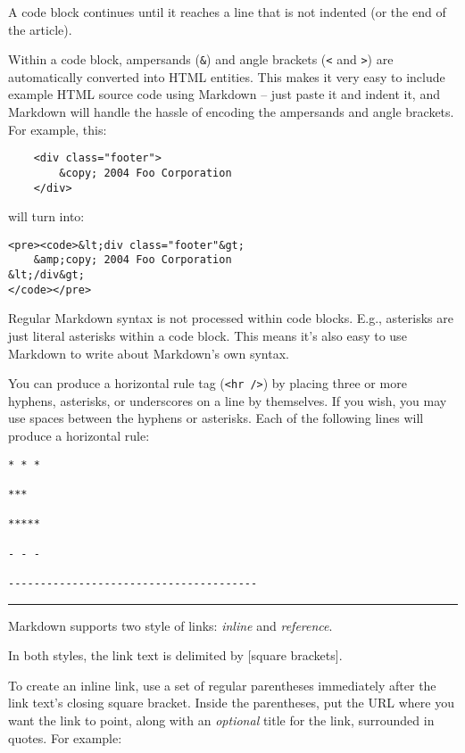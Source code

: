 A code block continues until it reaches a line that is not indented
(or the end of the article).

Within a code block, ampersands (\texttt{\&}) and angle brackets (\texttt{<} and \texttt{>})
are automatically converted into HTML entities. This makes it very
easy to include example HTML source code using Markdown -- just paste
it and indent it, and Markdown will handle the hassle of encoding the
ampersands and angle brackets. For example, this:

\begin{verbatim}
    <div class="footer">
        &copy; 2004 Foo Corporation
    </div>
\end{verbatim}

will turn into:

\begin{verbatim}
<pre><code>&lt;div class="footer"&gt;
    &amp;copy; 2004 Foo Corporation
&lt;/div&gt;
</code></pre>
\end{verbatim}

Regular Markdown syntax is not processed within code blocks. E.g.,
asterisks are just literal asterisks within a code block. This means
it's also easy to use Markdown to write about Markdown's own syntax.

You can produce a horizontal rule tag (\texttt{<hr \slash{}>}) by placing three or
more hyphens, asterisks, or underscores on a line by themselves. If you
wish, you may use spaces between the hyphens or asterisks. Each of the
following lines will produce a horizontal rule:

\begin{verbatim}
* * *

***

*****

- - -

---------------------------------------
\end{verbatim}

\begin{center}\rule{3in}{0.4pt}\end{center}

Markdown supports two style of links: \emph{inline} and \emph{reference}.

In both styles, the link text is delimited by {[square brackets]}.

To create an inline link, use a set of regular parentheses immediately
after the link text's closing square bracket. Inside the parentheses,
put the URL where you want the link to point, along with an \emph{optional}
title for the link, surrounded in quotes. For example:

